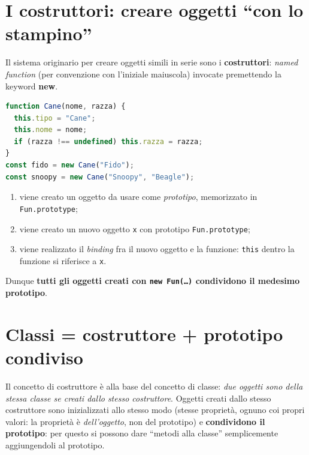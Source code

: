 \section{I costruttori: creare oggetti ``con lo stampino''}

Il sistema originario per creare oggetti simili in serie sono i \textbf{costruttori}:
\emph{named function} (per convenzione con l'iniziale maiuscola) invocate premettendo la
keyword \textbf{new}.
\begin{lstlisting}[language=JavaScript]
function Cane(nome, razza) {
  this.tipo = "Cane";
  this.nome = nome;
  if (razza !== undefined) this.razza = razza;
}
const fido = new Cane("Fido");
const snoopy = new Cane("Snoopy", "Beagle");
\end{lstlisting}

\begin{importante}
\begin{enumerate}
  \item viene creato un oggetto da usare come \emph{prototipo}, memorizzato in
        \texttt{Fun.prototype};
  \item viene creato un nuovo oggetto \texttt{x} con prototipo \texttt{Fun.prototype};
  \item viene realizzato il \emph{binding} fra il nuovo oggetto e la funzione: \texttt{this}
        dentro la funzione si riferisce a \texttt{x}.
\end{enumerate}
Dunque \textbf{tutti gli oggetti creati con \texttt{new Fun(\dots)} condividono il medesimo
prototipo}.
\end{importante}

\section{Classi = costruttore + prototipo condiviso}

\begin{definizione}
Il concetto di costruttore \`e alla base del concetto di classe: \emph{due oggetti sono della
stessa classe se creati dallo stesso costruttore}. Oggetti creati dallo stesso costruttore
sono inizializzati allo stesso modo (stesse propriet\`a, ognuno coi propri valori: la
propriet\`a \`e \emph{dell'oggetto}, non del prototipo) e \textbf{condividono il prototipo}:
per questo si possono dare ``metodi alla classe'' semplicemente aggiungendoli al prototipo.
\end{definizione}

